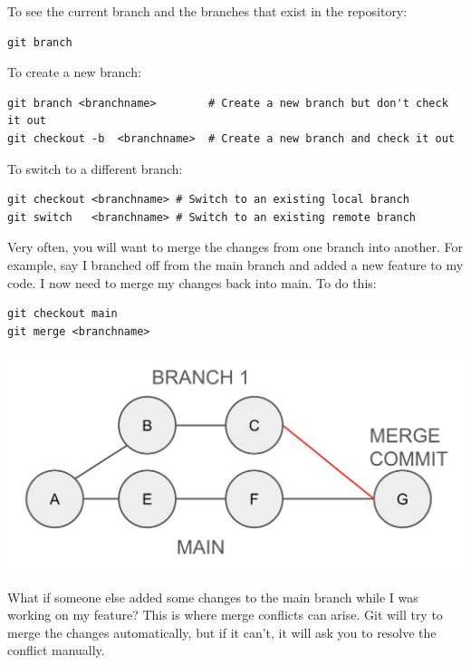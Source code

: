 \documentclass[fleqn]{article}
\begin{document}
To see the current branch and the branches that exist in the repository:

\begin{lstlisting}
git branch
\end{lstlisting}

To create a new branch:

\begin{lstlisting}
git branch <branchname>        # Create a new branch but don't check it out
git checkout -b  <branchname>  # Create a new branch and check it out
\end{lstlisting}

To switch to a different branch:

\begin{lstlisting}
git checkout <branchname> # Switch to an existing local branch
git switch   <branchname> # Switch to an existing remote branch
\end{lstlisting}

Very often, you will want to merge the changes from one branch into another. 
For example, say I branched off from the main branch and added a new feature 
to my code. I now need to merge my changes back into main. To do this:

\begin{lstlisting}
git checkout main
git merge <branchname>
\end{lstlisting}

\begin{center}
    \includegraphics[scale=0.3]{merge.png}
\end{center}

What if someone else added some changes to the main branch while I was working
on my feature? This is where merge conflicts can arise. Git will try to merge
the changes automatically, but if it can't, it will ask you to resolve the
conflict manually.

\pagebreak
\end{document}
